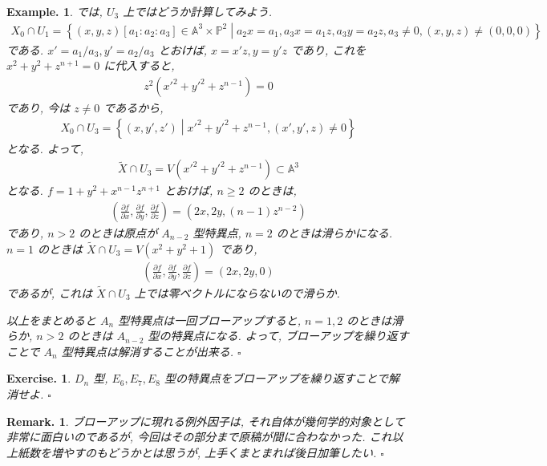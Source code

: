 \documentclass[openany, a4paper, oneside]{jsbook}
\theoremstyle{break}
\theoremstyle{breakdefn}
\newtheorem{ex}[thm]{Example.}
\newtheorem{exercise}[thm]{Exercise.}
\newtheorem{rem}[thm]{Remark.}
\newcommand{\rbk}[1]{\left (#1\right)}
\newcommand{\relmiddle}[1]{\mathrel{}\middle#1\mathrel{}}
\newcommand{\set}[2]{\left\{#1 \relmiddle| #2\right\}}
\newcommand{\fin}{\hfill $\square$ \par}
\begin{document}
\begin{ex}
では,  $U_3$ 上ではどうか計算してみよう.
\begin{align}
 X_0 \cap U_1
 =
 \set{(x,y,z) [a_1:a_2:a_3] \in \mathbb{A}^3 \times \mathbb{P}^2}{a_2x=a_1, a_3x=a_1z, a_3y=a_2z, a_3 \neq 0, (x,y,z) \neq (0,0,0)}
\end{align}
である.
$x'=a_1/a_3, y'=a_2/a_3$ とおけば, $x=x'z, y=y'z$ であり, これを $x^2+y^2+z^{n+1}=0$ に代入すると,
\begin{align}
 z^2 (x'^2+ y'^2+z^{n-1})
 =
 0
\end{align}
であり, 今は $z \neq 0$ であるから,
\begin{align}
 X_0 \cap U_3
 =
 \set{(x,y',z')}{x'^2+y'^2+z^{n-1}, (x',y',z) \neq 0}
\end{align}
となる.
よって,
\begin{align}
 \widetilde{X} \cap U_3
 =
 V (x'^2+y'^2+z^{n-1}) \subset \mathbb{A}^3
\end{align}
となる.
$f=1+y^2+x^{n-1}z^{n+1}$ とおけば, $n \geq 2$ のときは,
\begin{align}
 \rbk{\frac{\partial f}{\partial x}, \frac{\partial f}{\partial y}, \frac{\partial f}{\partial z}}
 =
 \rbk{2x, 2y, (n-1) z^{n-2}}
\end{align}
であり, $n>2$ のときは原点が $A_{n-2}$ 型特異点, $n=2$ のときは滑らかになる.
$n=1$ のときは $\widetilde{X} \cap U_3 = V (x^2+y^2+1)$ であり,
\begin{align}
 \rbk{\frac{\partial f}{\partial x}, \frac{\partial f}{\partial y}, \frac{\partial f}{\partial z}}
 =
 \rbk{2x, 2y, 0}
\end{align}
であるが, これは $\widetilde{X} \cap U_3$ 上では零ベクトルにならないので滑らか.

以上をまとめると $A_n$ 型特異点は一回ブローアップすると,
$n=1,2$ のときは滑らか, $n>2$ のときは $A_{n-2}$ 型の特異点になる.
よって, ブローアップを繰り返すことで $A_n$ 型特異点は解消することが出来る. \fin
\end{ex}
\begin{exercise}
$D_n$ 型, $E_6, E_7, E_8$ 型の特異点をブローアップを繰り返すことで解消せよ. \fin
\end{exercise}
\begin{rem}
ブローアップに現れる例外因子は, それ自体が幾何学的対象として非常に面白いのであるが,
今回はその部分まで原稿が間に合わなかった.
これ以上紙数を増やすのもどうかとは思うが, 上手くまとまれば後日加筆したい. \fin
\end{rem}
\end{document}
